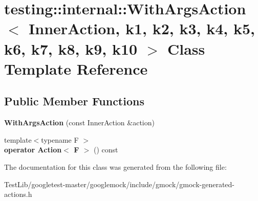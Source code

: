 \hypertarget{classtesting_1_1internal_1_1WithArgsAction}{}\section{testing\+:\+:internal\+:\+:With\+Args\+Action$<$ Inner\+Action, k1, k2, k3, k4, k5, k6, k7, k8, k9, k10 $>$ Class Template Reference}
\label{classtesting_1_1internal_1_1WithArgsAction}
\subsection*{Public Member Functions}
\begin{DoxyCompactItemize}
\item 
\mbox{\label{classtesting_1_1internal_1_1WithArgsAction_ab408f9c56c8f25564ef554b984e1c926}} 
{\bfseries With\+Args\+Action} (const Inner\+Action \&action)
\item 
\mbox{\label{classtesting_1_1internal_1_1WithArgsAction_ab6d8f89fd5a54f2914da2523b2ba6ee5}} 
{\footnotesize template$<$typename F $>$ }\\{\bfseries operator Action$<$ F $>$} () const
\end{DoxyCompactItemize}


The documentation for this class was generated from the following file\+:\begin{DoxyCompactItemize}
\item 
Test\+Lib/googletest-\/master/googlemock/include/gmock/gmock-\/generated-\/actions.\+h\end{DoxyCompactItemize}
